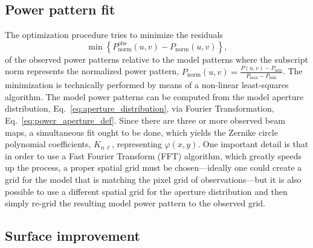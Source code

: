 \documentclass[
    ]
    {aa}
\begin{document}
    \subsection{Power pattern fit}

    The optimization procedure tries to minimize the residuals
    \begin{equation}
         \min \left\{P^\text{obs}_\text{norm}(u, v) - P_\text{norm}(u, v)\right\},
         \label{eq:min_residual}
    \end{equation}
    of the observed power patterns relative to the model patterns where the subscript norm represents the normalized power pattern, $P_\text{norm}(u, v) = \frac{P(u, v) - P_\text{min}}{P_\text{max} - P_\text{min}}$. The minimization is technically performed by means of a non-linear least-squares algorithm. The model power patterns can be computed from the model aperture distribution, Eq.~\eqref{eq:aperture_distribution}, via Fourier Transformation, Eq.~\eqref{eq:power_aperture_def}. Since there are three or more observed beam maps, a simultaneous fit ought to be done, which yields the Zernike circle polynomial coefficients, $K_{n\,\ell}$, representing $\varphi(x, y)$. 
    One important detail is that in order to use a Fast Fourier Transform (FFT) algorithm, which greatly speeds up the process, a proper spatial grid must be chosen---ideally one could create a grid for the model that is matching the pixel grid of observations---but it is also possible to use a different spatial grid for the aperture distribution and then simply re-grid the resulting model power pattern to the observed grid.

    \subsection{Surface improvement}
    \label{sec:surface_improvements}
\end{document}
